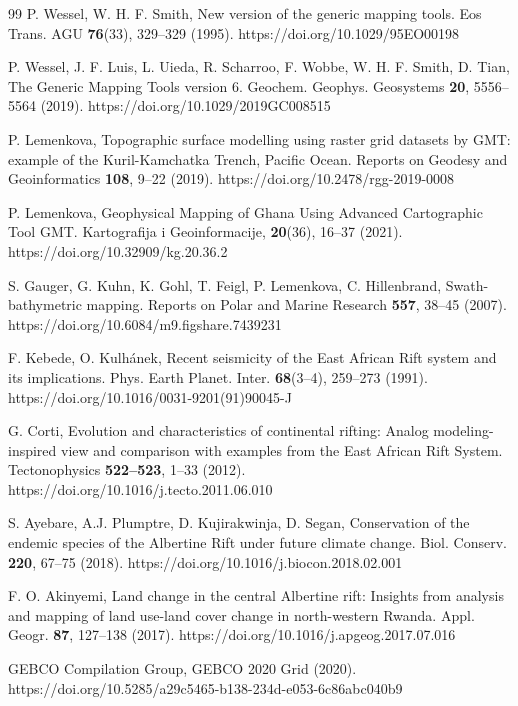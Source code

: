 \documentclass[myclassdoc,debug]{rjparticle}
\begin{document}
\begin{thebibliography}{99}
P. Wessel, W. H. F. Smith, New version of the generic mapping tools. Eos Trans. AGU \textbf{76}(33), 329--329 (1995). https://doi.org/10.1029/95EO00198 

P. Wessel, J. F. Luis, L. Uieda, R. Scharroo, F. Wobbe, W. H. F. Smith, D. Tian, The Generic Mapping Tools version 6. Geochem. Geophys. Geosystems \textbf{20}, 5556--5564 (2019). https://doi.org/10.1029/2019GC008515

P. Lemenkova, Topographic surface modelling using raster grid datasets by GMT: example of the Kuril-Kamchatka Trench, Pacific Ocean. Reports on Geodesy and Geoinformatics \textbf{108}, 9--22 (2019). https://doi.org/10.2478/rgg-2019-0008

P. Lemenkova, Geophysical Mapping of Ghana Using Advanced Cartographic Tool GMT. Kartografija i Geoinformacije, \textbf{20}(36), 16--37 (2021). https://doi.org/10.32909/kg.20.36.2

S. Gauger, G. Kuhn, K. Gohl, T. Feigl, P. Lemenkova, C. Hillenbrand, Swath-bathymetric mapping. Reports on Polar and Marine Research \textbf{557}, 38--45 (2007). https://doi.org/10.6084/m9.figshare.7439231

F. Kebede, O. Kulhánek, Recent seismicity of the East African Rift system and its implications. Phys. Earth Planet. Inter. \textbf{68}(3--4), 259--273 (1991). https://doi.org/10.1016/0031-9201(91)90045-J

G. Corti, Evolution and characteristics of continental rifting: Analog modeling-inspired view and comparison with examples from the East African Rift System. Tectonophysics \textbf{522--523}, 1--33 (2012). https://doi.org/10.1016/j.tecto.2011.06.010

S. Ayebare, A.J. Plumptre, D. Kujirakwinja, D. Segan, Conservation of the endemic species of the Albertine Rift under future climate change. Biol. Conserv. \textbf{220}, 67--75 (2018). https://doi.org/10.1016/j.biocon.2018.02.001

F. O. Akinyemi, Land change in the central Albertine rift: Insights from analysis and mapping of land use-land cover change in north-western Rwanda. Appl. Geogr. \textbf{87}, 127--138 (2017). https://doi.org/10.1016/j.apgeog.2017.07.016

GEBCO Compilation Group, GEBCO 2020 Grid (2020). https://doi.org/10.5285/a29c5465-b138-234d-e053-6c86abc040b9


\end{thebibliography}
\end{document}
